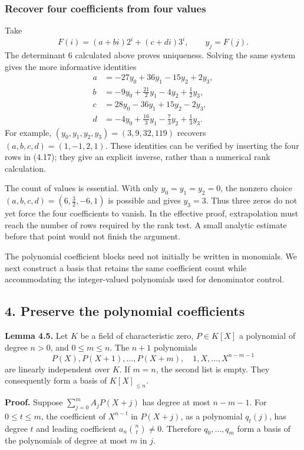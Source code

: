 \documentclass[
  11pt,
  a4paper,
]{article}
\begin{document}
\subsubsection{Recover four coefficients from four
values}\label{recover-four-coefficients-from-four-values}

Take \[
F(i)=(a+bi)2^i+(c+di)3^i,\qquad y_j=F(j).
\] The determinant \(6\) calculated above proves uniqueness. Solving the
same system gives the more informative identities \[
\begin{aligned}
a&=-27y_0+36y_1-15y_2+2y_3,\\
b&=-9y_0+\tfrac{21}{2}y_1-4y_2+\tfrac12y_3,\\
c&=28y_0-36y_1+15y_2-2y_3,\\
d&=-4y_0+\tfrac{16}{3}y_1-\tfrac73y_2+\tfrac13y_3.
\end{aligned}
\] For example, \((y_0,y_1,y_2,y_3)=(3,9,32,119)\) recovers
\((a,b,c,d)=(1,-1,2,1)\). These identities can be verified by inserting
the four rows in (4.17); they give an explicit inverse, rather than a
numerical rank calculation.

The count of values is essential. With only \(y_0=y_1=y_2=0\), the
nonzero choice \((a,b,c,d)=(6,\tfrac32,-6,1)\) is possible and gives
\(y_3=3\). Thus three zeros do not yet force the four coefficients to
vanish. In the effective proof, extrapolation must reach the number of
rows required by the rank test. A small analytic estimate before that
point would not finish the argument.

The polynomial coefficient blocks need not initially be written in
monomials. We next construct a basis that retains the same coefficient
count while accommodating the integer-valued polynomials used for
denominator control.

\subsection{4. Preserve the polynomial
coefficients}\label{preserve-the-polynomial-coefficients}

\textbf{Lemma 4.5.} Let \(K\) be a field of characteristic zero,
\(P\in K[X]\) a polynomial of degree \(n>0\), and \(0\le m\le n\). The
\(n+1\) polynomials \[
P(X),P(X+1),\ldots,P(X+m),\quad
1,X,\ldots,X^{n-m-1} \tag{4.14}
\] are linearly independent over \(K\). If \(m=n\), the second list is
empty. They consequently form a basis of \(K[X]_{\le n}\).

\textbf{Proof.} Suppose \(\sum_{j=0}^m A_jP(X+j)\) has degree at most
\(n-m-1\). For \(0\le t\le m\), the coefficient of \(X^{n-t}\) in
\(P(X+j)\), as a polynomial \(q_t(j)\), has degree \(t\) and leading
coefficient \(a_n\binom nt\ne0\). Therefore \(q_0,\ldots,q_m\) form a
basis of the polynomials of degree at most \(m\) in \(j\).
\end{document}
